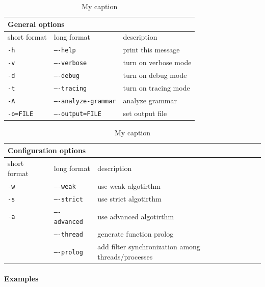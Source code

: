 \begin{table}[h]
\centering
	\begin{tabular}{||l|l|p{6cm}||}
	\hline
	\multicolumn{3}{||l||}{\textbf{General options}}              \\ \hline\hline
	short format & long format         & description \\ \hline
	\texttt{-h}           & \texttt{----help}              & print this message \\
	\texttt{-v}           & \texttt{----verbose}           & turn on verbose mode \\
	\texttt{-d}           & \texttt{----debug}             & turn on debug mode \\
	\texttt{-t}           & \texttt{----tracing}           & turn on tracing mode \\
	\texttt{-A}           & \texttt{----analyze-grammar} & analyze grammar \\
	\texttt{-o=FILE}      & \texttt{----output=FILE}       &  set output file \\ \hline
	\end{tabular}
	\caption{My caption}
	\label{my-label}
\end{table}

\begin{table}[h]
\centering
	\begin{tabular}{||l|l|p{6cm}||}
	\hline
	\multicolumn{3}{||l||}{\textbf{Configuration options}}              \\ \hline\hline
	short format & long format         & description \\ \hline
	\texttt{-w}           & \texttt{----weak}         & use weak algotirthm \\
	\texttt{-s}           & \texttt{----strict}       & use strict algotirthm \\
	\texttt{-a}           & \texttt{----advanced}     & use advanced algotirthm \\
	                      & \texttt{----thread}       & generate function prolog \\
	                      & \texttt{----prolog}       & add filter synchronization among threads/processes \\ \hline
	\end{tabular}
	\caption{My caption}
	\label{my-label}
\end{table}


\paragraph{Examples} \hspace{0pt} \\


